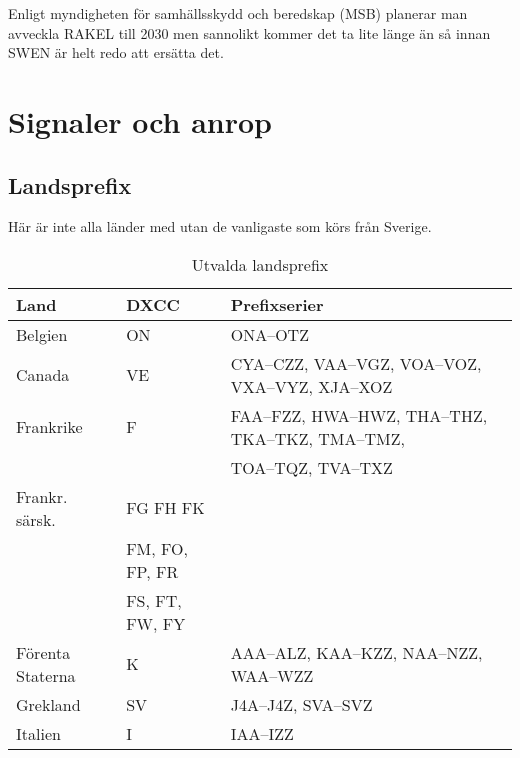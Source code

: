 Enligt myndigheten för samhällsskydd och beredskap (MSB) planerar man avveckla
RAKEL till 2030 men sannolikt kommer det ta lite länge än så innan SWEN är helt
redo att ersätta det.

\clearpage

\section{Signaler och anrop}

\subsection{Landsprefix}

Här är inte alla länder med utan de vanligaste som körs från Sverige.

\begin{center}
  \begin{footnotesize}
    \begin{longtable}{lll}
      \caption{Utvalda landsprefix} \\
      \textbf{Land}                 & \textbf{DXCC}  & \textbf{Prefixserier}                             \\ \hline
			Belgien                       & ON             & ONA--OTZ                                          \\
			Canada                        & VE             & CYA--CZZ, VAA--VGZ, VOA--VOZ, VXA--VYZ, XJA--XOZ  \\
			Frankrike                     & F              & FAA--FZZ, HWA--HWZ, THA--THZ, TKA--TKZ, TMA--TMZ, \\
			                              &                & TOA--TQZ, TVA--TXZ                                \\
			Frankr. särsk.                & FG FH FK       &                                                   \\
			                              & FM, FO, FP, FR &                                                   \\
			                              & FS, FT, FW, FY &                                                   \\
			Förenta Staterna              & K              & AAA--ALZ, KAA--KZZ, NAA--NZZ, WAA--WZZ            \\
			Grekland                      & SV             & J4A--J4Z, SVA--SVZ                                \\
			Italien                       & I              & IAA--IZZ                                          \\

\end{longtable}
\end{footnotesize}
\end{center}
